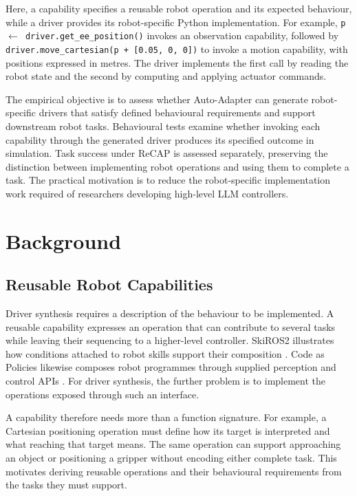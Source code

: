 Here, a capability specifies a reusable robot operation and its expected
behaviour, while a driver provides its robot-specific Python implementation.
For example, \texttt{p \ensuremath{\leftarrow} driver.get\_ee\_position()}
invokes an observation capability, followed by
\texttt{driver.move\_cartesian(p + [0.05, 0, 0])} to invoke a motion capability,
with positions expressed in metres. The driver implements the first call by
reading the robot state and the second by computing and applying actuator
commands.

The empirical objective is to assess whether Auto-Adapter can generate
robot-specific drivers that satisfy defined behavioural requirements and
support downstream robot tasks. Behavioural tests examine whether invoking
each capability through the generated driver produces its specified outcome
in simulation. Task success under ReCAP is assessed separately, preserving
the distinction between implementing robot operations and using them to
complete a task. The practical motivation is to reduce the robot-specific
implementation work required of researchers developing high-level LLM
controllers.

\section{Background}

\subsection{Reusable Robot Capabilities}

Driver synthesis requires a description of the behaviour to be implemented.
A reusable capability expresses an operation that can contribute to several
tasks while leaving their sequencing to a higher-level controller. SkiROS2
illustrates how conditions attached to robot skills support their composition
\citep{mayr2023skiros2}. Code as Policies likewise composes robot programmes
through supplied perception and control APIs \citep{liang2023codeaspolicies}.
For driver synthesis, the further problem is to implement the operations
exposed through such an interface.

A capability therefore needs more than a function signature. For example, a
Cartesian positioning operation must define how its target is interpreted and
what reaching that target means. The same operation can support approaching
an object or positioning a gripper without encoding either complete task.
This motivates deriving reusable operations and their behavioural requirements
from the tasks they must support.

